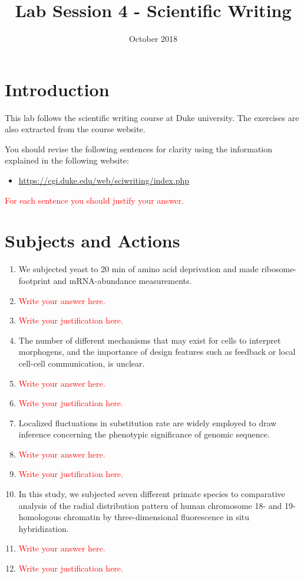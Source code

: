 \documentclass{article}
\title{Lab Session 4 - Scientific Writing}
\date{October 2018}
\newcommand{\red}[1]{\textcolor{red}{#1}}
\begin{document}
\maketitle

\section{Introduction}
This lab follows the scientific writing course at Duke university. The exercises are also extracted from the course website.

You should revise the following sentences for clarity using the information explained in the following website:
\begin{itemize}
    \item \url{https://cgi.duke.edu/web/sciwriting/index.php}
\end{itemize}

\red{For each sentence you should justify your answer.}

\section{Subjects and Actions}

\begin{enumerate}
        
    \item We subjected yeast to 20 min of amino acid deprivation and made ribosome-footprint and mRNA-abundance measurements.
    \item[] \red{Write your answer here.}
    \item[] \red{Write your justification here.}
    
    \item The number of different mechanisms that may exist for cells to interpret morphogens, and the importance of design features such as feedback or local cell-cell communication, is unclear.
    \item[] \red{Write your answer here.}
     \item[] \red{Write your justification here.}
     
    \item Localized fluctuations in substitution rate are widely employed to draw inference concerning the phenotypic significance of genomic sequence.
    \item[] \red{Write your answer here.}
     \item[] \red{Write your justification here.}
     
    \item In this study, we subjected seven different primate species to comparative analysis of the radial distribution pattern of human chromosome 18- and 19-homologous chromatin by three-dimensional fluorescence in situ hybridization.
    \item[] \red{Write your answer here.}
     \item[] \red{Write your justification here.}
\end{enumerate}
\end{document}
